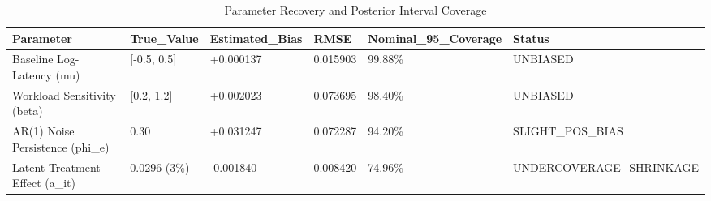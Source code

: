 \begin{table}[htbp]
\centering
\caption{Parameter Recovery and Posterior Interval Coverage}
\label{tab:table_T4_telemetry_invariants}
\begin{tabular}{llllll}
\hline
Parameter & True\_Value & Estimated\_Bias & RMSE & Nominal\_95\_Coverage & Status \\
\hline
Baseline Log-Latency (mu) & [-0.5, 0.5] & +0.000137 & 0.015903 & 99.88\% & UNBIASED \\
Workload Sensitivity (beta) & [0.2, 1.2] & +0.002023 & 0.073695 & 98.40\% & UNBIASED \\
AR(1) Noise Persistence (phi\_e) & 0.30 & +0.031247 & 0.072287 & 94.20\% & SLIGHT\_POS\_BIAS \\
Latent Treatment Effect (a\_it) & 0.0296 (3\%) & -0.001840 & 0.008420 & 74.96\% & UNDERCOVERAGE\_SHRINKAGE \\
\hline
\end{tabular}
\end{table}
